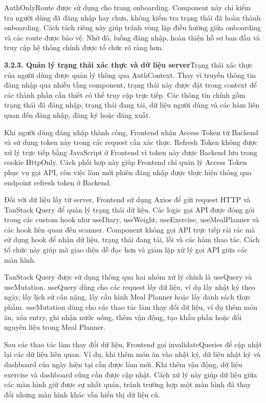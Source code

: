 AuthOnlyRoute được sử dụng cho trang onboarding. Component này chỉ kiểm tra người dùng đã đăng nhập hay chưa, không kiểm tra trạng thái đã hoàn thành onboarding. Cách tách riêng này giúp tránh vòng lặp điều hướng giữa onboarding và các route được bảo vệ. Nhờ đó, luồng đăng nhập, hoàn thiện hồ sơ ban đầu và truy cập hệ thống chính được tổ chức rõ ràng hơn.

\textbf{3.2.3. Quản lý trạng thái xác thực và dữ liệu server}Trạng thái xác thực của người dùng được quản lý thông qua AuthContext. Thay vì truyền thông tin đăng nhập qua nhiều tầng component, trạng thái này được đặt trong context để các thành phần cần thiết có thể truy cập trực tiếp. Các thông tin chính gồm trạng thái đã đăng nhập, trạng thái đang tải, dữ liệu người dùng và các hàm liên quan đến đăng nhập, đăng ký hoặc đăng xuất.

Khi người dùng đăng nhập thành công, Frontend nhận Access Token từ Backend và sử dụng token này trong các request cần xác thực. Refresh Token không được xử lý trực tiếp bằng JavaScript ở Frontend vì token này được Backend lưu trong cookie HttpOnly. Cách phối hợp này giúp Frontend chỉ quản lý Access Token phục vụ gọi API, còn việc làm mới phiên đăng nhập được thực hiện thông qua endpoint refresh token ở Backend.

Đối với dữ liệu lấy từ server, Frontend sử dụng Axios để gửi request HTTP và TanStack Query để quản lý trạng thái dữ liệu. Các logic gọi API được đóng gói trong các custom hook như useDiary, useWeight, useExercise, useMealPlanner và các hook liên quan đến scanner. Component không gọi API trực tiếp rải rác mà sử dụng hook để nhận dữ liệu, trạng thái đang tải, lỗi và các hàm thao tác. Cách tổ chức này giúp mã giao diện dễ đọc hơn và giảm lặp xử lý gọi API giữa các màn hình.

TanStack Query được sử dụng thông qua hai nhóm xử lý chính là useQuery và useMutation. useQuery dùng cho các request lấy dữ liệu, ví dụ lấy nhật ký theo ngày, lấy lịch sử cân nặng, lấy cấu hình Meal Planner hoặc lấy danh sách thực phẩm. useMutation dùng cho các thao tác làm thay đổi dữ liệu, ví dụ thêm món ăn, xóa entry, ghi nhận nước uống, thêm vận động, tạo khẩu phần hoặc đổi nguyên liệu trong Meal Planner.

Sau các thao tác làm thay đổi dữ liệu, Frontend gọi invalidateQueries để cập nhật lại các dữ liệu liên quan. Ví dụ, khi thêm món ăn vào nhật ký, dữ liệu nhật ký và dashboard của ngày hiện tại cần được làm mới. Khi thêm vận động, dữ liệu exercise và dashboard cũng cần được cập nhật. Cách xử lý này giúp dữ liệu giữa các màn hình giữ được sự nhất quán, tránh trường hợp một màn hình đã thay đổi nhưng màn hình khác vẫn hiển thị dữ liệu cũ.

